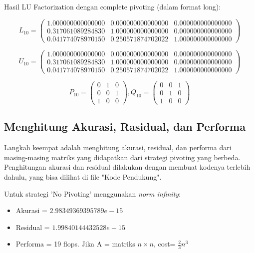 \documentclass[11pt]{article}
\begin{document}
Hasil LU Factorization dengan complete pivoting (dalam format long):

\[
L_{10} = \begin{pmatrix}
1.000000000000000 & 0.000000000000000 & 0.000000000000000\\
0.317061089284830 & 1.000000000000000 & 0.000000000000000\\
0.041774078970150 & 0.250571874702022 & 1.000000000000000
\end{pmatrix}
\]

\[
U_{10} = \begin{pmatrix}
1.000000000000000 &  0.000000000000000  & 0.000000000000000\\
0.317061089284830  & 1.000000000000000  & 0.000000000000000\\
0.041774078970150  & 0.250571874702022 &  1.000000000000000
\end{pmatrix}
\]

\[
P_{10} = \begin{pmatrix}
0 & 1 & 0\\
0 & 0 & 1\\
1 & 0 & 0
\end{pmatrix}
,
Q_{10} = \begin{pmatrix}
0 & 0 & 1\\
0 & 1 & 0\\
1 & 0 & 0
\end{pmatrix}
\]


\subsection{Menghitung Akurasi, Rasidual, dan Performa}
Langkah keempat adalah menghitung akurasi, residual, dan performa dari masing-masing matriks yang didapatkan dari strategi pivoting yang berbeda. Penghitungan akurasi dan residual dilakukan dengan membuat kodenya terlebih dahulu, yang bisa dilihat di file "Kode Pendukung".

\vspace{3mm}
Untuk strategi 'No Pivoting' menggunakan \textit{norm infinity}:

\begin{itemize}
    \item Akurasi = $2.98349369395789e-15$
    \item Residual = $1.99840144432528e-15$
    \item Performa = 19 flops. Jika A = matriks $n \times n$, cost= $\frac{2}{3} n^3$
\end{itemize}
\end{document}
